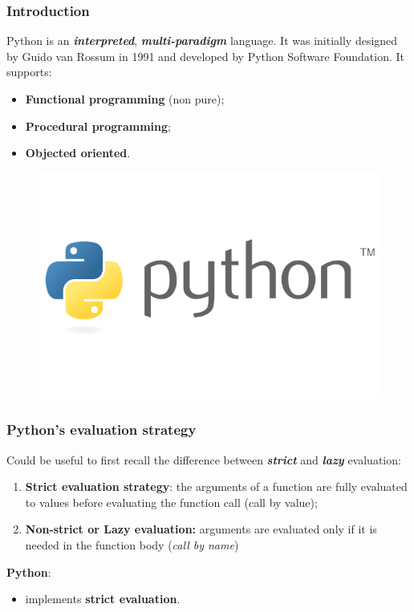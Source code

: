 \documentclass[xcolor ={table,usenames,dvipsnames}]{beamer}
\theoremstyle{definition}
\begin{document}
	\begin{frame}
		\frametitle{Introduction}
		Python is an \textit{\textbf{interpreted}}, \textit{\textbf{multi-paradigm}} language. It was initially designed by Guido van Rossum in 1991 and developed by Python Software Foundation. It supports:
		\begin{itemize}
			\item \textbf{Functional programming } (non pure);
			\item \textbf{Procedural programming};
			\item \textbf{Objected oriented}.
		\end{itemize}
		\begin{figure}[]
			\centering
			\includegraphics[scale=0.3]{img/python.png}
			\label{Interfacce di un CS}
		\end{figure}
	\end{frame}

	\begin{frame}
		\frametitle{Python's evaluation strategy}
			Could be useful to first recall the difference between \textit{\textbf{strict}} and \textit{\textbf{lazy}} evaluation:
			\begin{enumerate}
				\item \textbf{Strict evaluation strategy}: the arguments of a function are fully evaluated to values before evaluating the function call (call by value);
				\item \textbf{Non-strict or Lazy evaluation:} arguments are evaluated only if it is needed in the function body (\textit{call by name})
			\end{enumerate}
			\textbf{Python}:		
			\begin{itemize}
				\item implements \textbf{strict evaluation}.
			\end{itemize}
	\end{frame}
\end{document}
